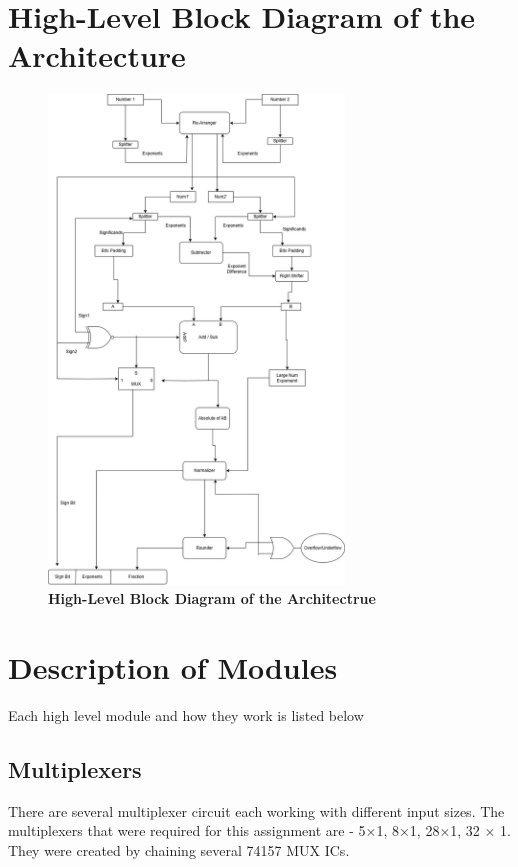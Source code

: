 \documentclass{article}
\begin{document}
\section{High-Level Block Diagram of the Architecture}
\begin{figure}[h]
    \centering 
    \includegraphics[width = 0.7\textwidth]{fpa.jpg}
    \caption{\textbf{High-Level Block Diagram of the Architectrue}}
\end{figure}
\pagebreak 

\section{Description of Modules}
Each high level module and how they work is listed below
\subsection{\textbf{Multiplexers}}
There are several multiplexer circuit each working with different input sizes.
The multiplexers that were required for this assignment are - 5×1, 8×1, 28×1,
32 × 1. They were created by chaining several 74157 MUX ICs.
\\ 
\\
\end{document}
